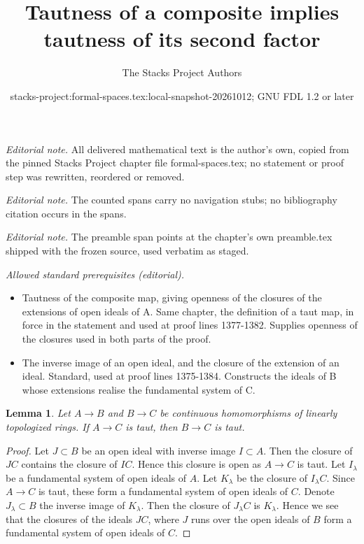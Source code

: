 \documentclass{stacks-project}
\title{Tautness of a composite implies tautness of its second factor}
\author{The Stacks Project Authors}
\date{stacks-project:formal-spaces.tex:local-snapshot-20261012; GNU FDL 1.2 or later}
\theoremstyle{plain}
\newtheorem{lemma}[subsection]{Lemma}
\theoremstyle{definition}
\theoremstyle{remark}
\numberwithin{equation}{subsection}
\begin{document}
\maketitle
\noindent\textit{Editorial note.} All delivered mathematical text is the author's own, copied from the pinned Stacks Project chapter file formal-spaces.tex; no statement or proof step was rewritten, reordered or removed.\par\medskip
\noindent\textit{Editorial note.} The counted spans carry no navigation stubs; no bibliography citation occurs in the spans.\par\medskip
\noindent\textit{Editorial note.} The preamble span points at the chapter's own preamble.tex shipped with the frozen source, used verbatim as staged.\par\medskip
\noindent\textit{Allowed standard prerequisites (editorial).}\begin{itemize}
\item Tautness of the composite map, giving openness of the closures of the extensions of open ideals of A. Same chapter, the definition of a taut map, in force in the statement and used at proof lines 1377-1382. Supplies openness of the closures used in both parts of the proof.
\item The inverse image of an open ideal, and the closure of the extension of an ideal. Standard, used at proof lines 1375-1384. Constructs the ideals of B whose extensions realise the fundamental system of C.
\end{itemize}\medskip
\begin{lemma}
\label{lemma-permanence-taut}
Let $A \to B$ and $B \to C$ be continuous homomorphisms of
linearly topologized rings. If $A \to C$ is taut, then
$B \to C$ is taut.
\end{lemma}

\begin{proof}
Let $J \subset B$ be an open ideal with inverse image $I \subset A$.
Then the closure of $JC$ contains the closure of $IC$. Hence this
closure is open as $A \to C$ is taut. Let $I_\lambda$ be a fundamental
system of open ideals of $A$. Let $K_\lambda$ be the closure of
$I_\lambda C$. Since $A \to C$ is taut, these form a fundamental
system of open ideals of $C$. Denote $J_\lambda \subset B$ the inverse image
of $K_\lambda$. Then the closure of $J_\lambda C$ is $K_\lambda$.
Hence we see that the closures of the ideals $JC$, where $J$ runs over
the open ideals of $B$ form a fundamental system of open ideals of $C$.
\end{proof}
\end{document}
